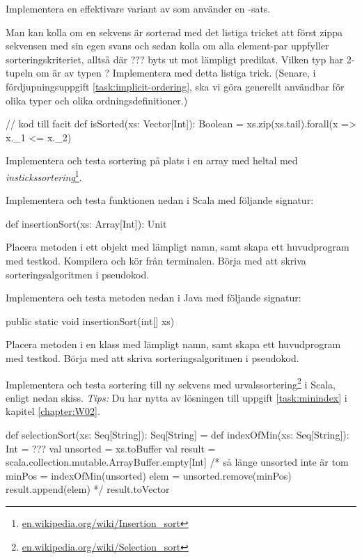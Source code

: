 
\Subtask Implementera en effektivare variant av  som använder en -sats.

\Subtask \label{subtask:isSorted-zip} Man kan kolla om en sekvens är sorterad med det listiga tricket att först zippa sekvensen med sin egen svans och sedan kolla om alla element-par uppfyller sorteringskriteriet, alltså  där ??? byts ut mot lämpligt predikat. Vilken typ har 2-tupeln  om  är av typen ? Implementera  med detta listiga trick. (Senare, i fördjupningsuppgift \ref{task:implicit-ordering}, ska vi göra  generellt användbar för olika typer och olika ordningsdefinitioner.)
\begin{Code}
// kod till facit
def isSorted(xs: Vector[Int]): Boolean = 
  xs.zip(xs.tail).forall(x => x._1 <= x._2) 
\end{Code}



\Task Implementera och testa sortering på plats i en array med heltal med \emph{instickssortering}\footnote{\href{https://en.wikipedia.org/wiki/Insertion_sort}{en.wikipedia.org/wiki/Insertion\_sort}}. 

\Subtask Implementera och testa funktionen nedan i Scala med följande signatur:
\begin{Code}
  def insertionSort(xs: Array[Int]): Unit 
\end{Code}
Placera metoden i ett objekt med lämpligt namn, samt skapa ett huvudprogram med testkod. Kompilera och kör från terminalen. Börja med att skriva sorteringsalgoritmen i pseudokod.

\Subtask Implementera och testa metoden nedan i Java med följande signatur:
\begin{Code}[language=Java]
  public static void insertionSort(int[] xs) 
\end{Code}
Placera metoden i en klass med lämpligt namn, samt skapa ett huvudprogram med testkod. Börja med att skriva sorteringsalgoritmen i pseudokod.

\Task Implementera och testa sortering till ny sekvens med urvalssortering\footnote{\href{https://en.wikipedia.org/wiki/Selection_sort}{en.wikipedia.org/wiki/Selection\_sort}} i Scala, enligt nedan skiss. \emph{Tips:} Du har nytta av lösningen till uppgift \ref{task:minindex} i kapitel \ref{chapter:W02}.
\begin{Code}
def selectionSort(xs: Seq[String]): Seq[String] = {
  def indexOfMin(xs: Seq[String]): Int = ??? 
  val unsorted = xs.toBuffer
  val result = scala.collection.mutable.ArrayBuffer.empty[Int]
  /* 
  så länge unsorted inte är tom {
    minPos = indexOfMin(unsorted)
    elem   = unsorted.remove(minPos)
    result.append(elem)
  }
  */
  result.toVector
}
\end{Code} 


